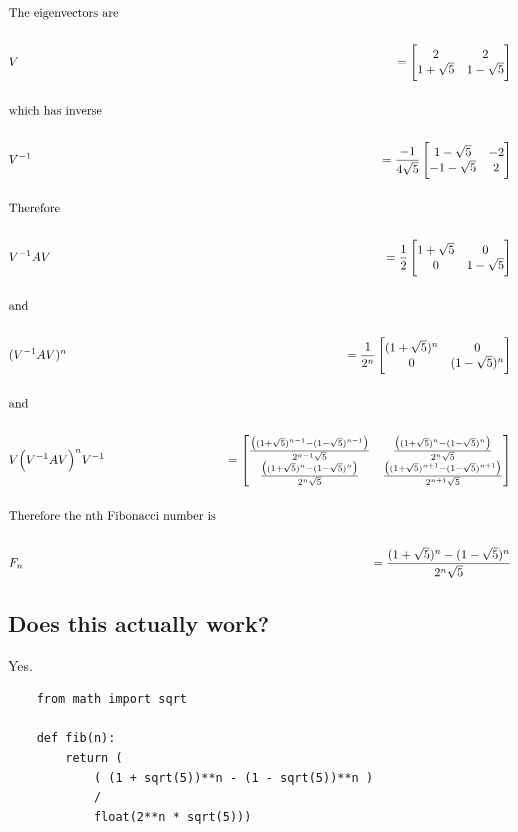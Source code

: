 \begin{lemma}
\begin{align*}
&\text{The eigenvectors are}
\\\\
&V &= \begin{bmatrix}2           & 2          \\1 + \sqrt 5 & 1 - \sqrt 5\\ \end{bmatrix}
\\\\
&\text{which has inverse}
\\\\
&V^{-1} &= \frac{-1}{4\sqrt 5} \begin{bmatrix}1 - \sqrt 5  & -2\\-1 - \sqrt 5 & 2\\ \end{bmatrix}
\\\\
&\text{Therefore}
\\\\
&V^{-1}AV &= \frac{1}{2} \begin{bmatrix}1 + \sqrt 5 & 0          \\0           & 1 - \sqrt 5\\ \end{bmatrix}
\\\\
&\text{and}
\\\\
&(V^{-1}AV)^n &= \frac{1}{2^n} \begin{bmatrix}(1 + \sqrt 5)^n & 0          \\0                 & (1 - \sqrt 5)^n\\ \end{bmatrix}
\\\\
&\text{and}
\\\\
&V \Big(V^{-1}AV\Big)^n V^{-1} &=
\begin{bmatrix}\frac{\big((1 + \sqrt 5)^{n-1} - (1 - \sqrt 5)^{n-1}\big)}{2^{n-1}\sqrt 5} & \frac{\big((1 + \sqrt 5)^n     - (1 - \sqrt 5)^n    \big)}{2^n    \sqrt 5}\\\frac{\big((1 + \sqrt 5)^n     - (1 - \sqrt 5)^n    \big)}{2^n    \sqrt 5} & \frac{\big((1 + \sqrt 5)^{n+1} - (1 - \sqrt 5)^{n+1}\big)}{2^{n+1}\sqrt 5}\\ \end{bmatrix}
\\\\
&\text{Therefore the nth Fibonacci number is}
\\\\
&F_n &= \frac{(1 + \sqrt 5)^n     - (1 - \sqrt 5)^n}
             {2^n    \sqrt 5}
\end{align*}

\newpage
\subsection*{Does this actually work?}

Yes.

\begin{verbatim}
    from math import sqrt

    def fib(n):
        return (
            ( (1 + sqrt(5))**n - (1 - sqrt(5))**n )
            /
            float(2**n * sqrt(5)))


\end{verbatim}
\end{lemma}
